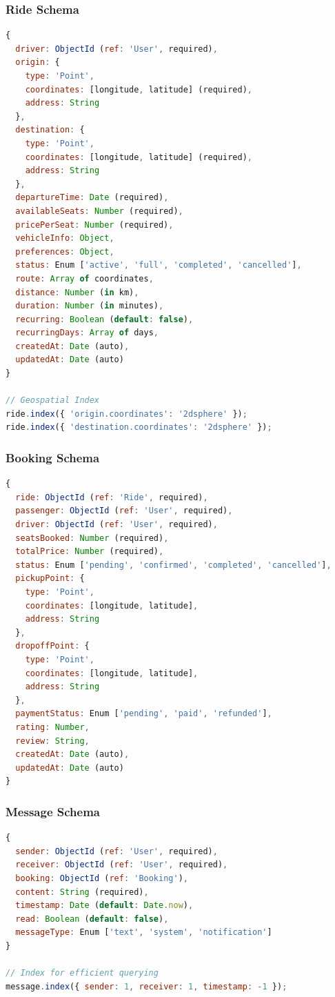 \documentclass[12pt,a4paper]{article}
\begin{document}
\subsubsection{Ride Schema}
\begin{lstlisting}[language=JavaScript, caption=Ride Model Structure]
{
  driver: ObjectId (ref: 'User', required),
  origin: {
    type: 'Point',
    coordinates: [longitude, latitude] (required),
    address: String
  },
  destination: {
    type: 'Point',
    coordinates: [longitude, latitude] (required),
    address: String
  },
  departureTime: Date (required),
  availableSeats: Number (required),
  pricePerSeat: Number (required),
  vehicleInfo: Object,
  preferences: Object,
  status: Enum ['active', 'full', 'completed', 'cancelled'],
  route: Array of coordinates,
  distance: Number (in km),
  duration: Number (in minutes),
  recurring: Boolean (default: false),
  recurringDays: Array of days,
  createdAt: Date (auto),
  updatedAt: Date (auto)
}

// Geospatial Index
ride.index({ 'origin.coordinates': '2dsphere' });
ride.index({ 'destination.coordinates': '2dsphere' });
\end{lstlisting}

\subsubsection{Booking Schema}
\begin{lstlisting}[language=JavaScript, caption=Booking Model Structure]
{
  ride: ObjectId (ref: 'Ride', required),
  passenger: ObjectId (ref: 'User', required),
  driver: ObjectId (ref: 'User', required),
  seatsBooked: Number (required),
  totalPrice: Number (required),
  status: Enum ['pending', 'confirmed', 'completed', 'cancelled'],
  pickupPoint: {
    type: 'Point',
    coordinates: [longitude, latitude],
    address: String
  },
  dropoffPoint: {
    type: 'Point',
    coordinates: [longitude, latitude],
    address: String
  },
  paymentStatus: Enum ['pending', 'paid', 'refunded'],
  rating: Number,
  review: String,
  createdAt: Date (auto),
  updatedAt: Date (auto)
}
\end{lstlisting}

\subsubsection{Message Schema}
\begin{lstlisting}[language=JavaScript, caption=Message Model Structure]
{
  sender: ObjectId (ref: 'User', required),
  receiver: ObjectId (ref: 'User', required),
  booking: ObjectId (ref: 'Booking'),
  content: String (required),
  timestamp: Date (default: Date.now),
  read: Boolean (default: false),
  messageType: Enum ['text', 'system', 'notification']
}

// Index for efficient querying
message.index({ sender: 1, receiver: 1, timestamp: -1 });
\end{lstlisting}
\end{document}
